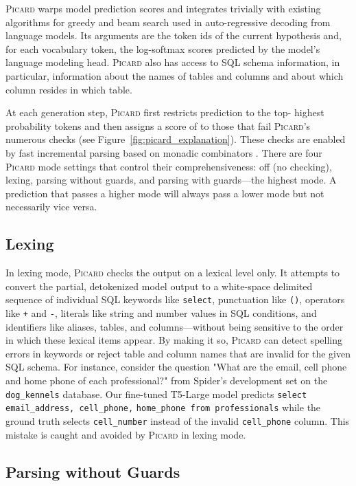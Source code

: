 \documentclass[11pt]{article}
\newcommand{\Picard}{\textsc{Picard}}
\begin{document}
\Picard{} warps model prediction scores
and integrates trivially with existing algorithms for
greedy and beam search used in
auto-regressive decoding from language models.
Its arguments are the token ids of the current hypothesis
and, for each vocabulary token, the log-softmax scores
predicted by the model's language modeling head.
\Picard{} also has access to SQL schema information,
in particular, information about the names of tables and columns
and about which column resides in which table.

At each generation step,
\Picard{} first restricts prediction to
the top- highest probability tokens
and then assigns a score of  to those
that fail \Picard{}'s numerous checks
(see Figure~\ref{fig:picard_explanation}).
These checks are enabled by fast incremental parsing \cite{attoparsec}
based on monadic combinators \cite{leijen2001parsec}.
There are four \Picard{} mode settings that
control their comprehensiveness:
off (no checking),
lexing,
parsing without guards, and
parsing with guards---the highest mode.
A prediction that passes a higher mode will always pass a lower mode
but not necessarily vice versa.

\subsection{Lexing}

In lexing mode, \Picard{} checks the output on a lexical level only.
It attempts to convert the partial, detokenized model output to
a white-space delimited sequence of individual
SQL keywords like \verb+select+,
punctuation like \verb+()+,
operators like \verb-+- and \verb+-+,
literals like string and number values in SQL conditions,
and identifiers like aliases, tables, and columns---without being sensitive to the order in which these lexical items appear.
By making it so, \Picard{} can detect spelling errors in keywords
or reject table and column names that are invalid for the given SQL schema.
For instance, consider the question
"What are the email, cell phone and home phone of each professional?"
from Spider's development set on the \verb+dog_kennels+ database.
Our fine-tuned T5-Large model predicts
\verb+select email_address, cell_phone,+
\verb+home_phone from professionals+
while the ground truth selects \verb+cell_number+ instead of
the invalid \verb+cell_phone+ column.
This mistake is caught and avoided by \Picard{} in lexing mode.

\subsection{Parsing without Guards}
\end{document}
